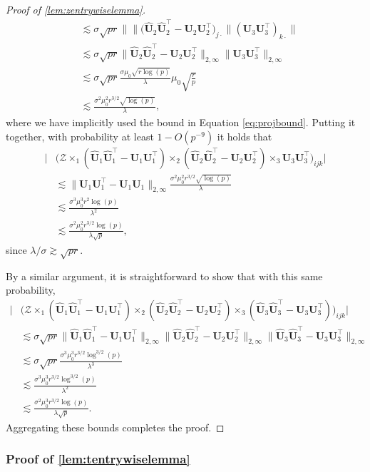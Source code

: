 \documentclass[10pt]{article}
\newcommand{\0}{{\mathbf{0}}}
\newcommand{\1}{{\mathbf{1}}}
\newcommand{\U}{{\mathbf{U}}}
\renewcommand{\t}{^{\top}}
\newcommand{\uhat}{\mathbf{\hat{U}}}
\renewcommand{\hat}{\widehat}
\renewcommand{\hat}{\widehat}
\begin{document}
\begin{proof}[Proof of \cref{lem:zentrywiselemma}]
\begin{align*}
    &\lesssim \sigma \sqrt{pr}\| \| \big(\uhat_2 \uhat_2\t - \U_2 \U_2\t \big)_{j\cdot}\| (\U_3 \U_3\t )_{k\cdot}\| \\
    &\lesssim \sigma \sqrt{pr} \| \uhat_2 \uhat_2\t - \U_2 \U_2\t \|_{2,\infty} \|\U_3 \U_3\t\|_{2,\infty} \\
    &\lesssim \sigma \sqrt{pr} \frac{\sigma \mu_0 \sqrt{r\log(p)}}{\lambda} \mu_0 \sqrt{\frac{r}{p}} \\
    &\lesssim \frac{\sigma^2 \mu_0^2 r^{3/2} \sqrt{\log(p)}}{\lambda},
\end{align*}
where we have implicitly used the bound in Equation \eqref{eq:projbound}.  Putting it together, with probability at least $1-O(p^{-9})$ it holds that
\begin{align*}
     \bigg| &\bigg( \mathcal{Z} \times_1 (\uhat_1 \uhat_1\t - \U_1 \U_1\t) \times_2 (\uhat_2 \uhat_2\t - \U_2 \U_2\t) \times_3 \U_3 \U_3\t \bigg)_{ijk} \bigg|  \\
     &\lesssim \| \U_1 \U_1\t - \U_1 \U_1 \|_{2,\infty}\frac{\sigma^2 \mu_0^2 r^{3/2} \sqrt{\log(p)}}{\lambda} \\
     &\lesssim \frac{\sigma^3 \mu_0^3 r^2 \log(p)}{\lambda^2} \\
     &\lesssim \frac{\sigma^2 \mu_0^2 r^{3/2} \log(p)}{\lambda \sqrt{p}},
\end{align*}
since $\lambda/\sigma \gtrsim \sqrt{pr}$.  

By a similar argument, it is straightforward to show that with this same probability,
\begin{align*}
    \bigg| &\bigg( \mathcal{Z} \times_1 (\uhat_1 \uhat_1\t - \U_1 \U_1\t) \times_2 (\uhat_2 \uhat_2\t - \U_2 \U_2\t) \times_3 (\uhat_3 \uhat_3\t - \U_3 \U_3\t) \bigg)_{ijk} \bigg| \\
    &\lesssim \sigma \sqrt{pr} \|   \uhat_1 \uhat_1\t - \U_1 \U_1\t \|_{2,\infty} \| \uhat_2 \uhat_2\t - \U_2 \U_2\t \|_{2,\infty} \| \uhat_3 \uhat_3\t - \U_3 \U_3\t \|_{2,\infty} \\
    &\lesssim \sigma \sqrt{pr} \frac{ \sigma^3 \mu_0^3 r^{3/2}\log^{3/2}(p) }{\lambda^3} \\
    &\lesssim  \frac{ \sigma^3 \mu_0^3 r^{3/2}\log^{3/2}(p) }{\lambda^2} \\
    &\lesssim \frac{\sigma^2 \mu_0^3 r^{3/2} \log(p)}{\lambda \sqrt{p}}.
\end{align*}
Aggregating these bounds completes the proof.
\end{proof}

\subsubsection{Proof of \cref{lem:tentrywiselemma}}
\end{document}
